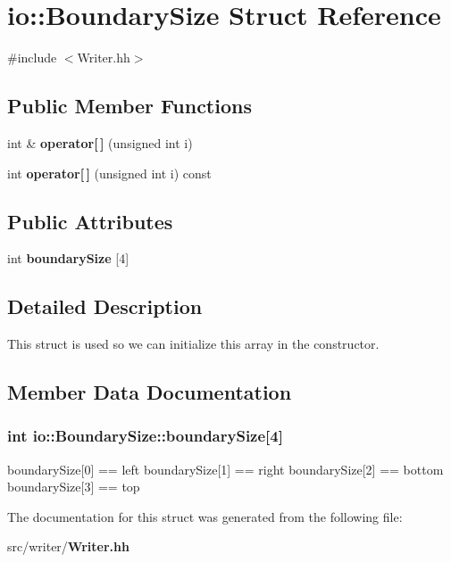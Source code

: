 \section{io\-:\-:Boundary\-Size Struct Reference}
\label{structio_1_1BoundarySize}


{\ttfamily \#include $<$Writer.\-hh$>$}

\subsection*{Public Member Functions}
\begin{DoxyCompactItemize}
\item 
int \& {\bfseries operator[$\,$]} (unsigned int i)\label{structio_1_1BoundarySize_a4130ec88292d4a0eff9c402a90ef907d}

\item 
int {\bfseries operator[$\,$]} (unsigned int i) const \label{structio_1_1BoundarySize_ab7593d2a82890d5d255c30d1dd8fee08}

\end{DoxyCompactItemize}
\subsection*{Public Attributes}
\begin{DoxyCompactItemize}
\item 
int {\bf boundary\-Size} [4]
\end{DoxyCompactItemize}


\subsection{Detailed Description}
This struct is used so we can initialize this array in the constructor. 

\subsection{Member Data Documentation}
\subsubsection[{boundary\-Size}]{\setlength{\rightskip}{0pt plus 5cm}int io\-::\-Boundary\-Size\-::boundary\-Size[4]}\label{structio_1_1BoundarySize_ae1ac1aecc0b840076b68948dc2ceba8a}
boundary\-Size[0] == left boundary\-Size[1] == right boundary\-Size[2] == bottom boundary\-Size[3] == top 

The documentation for this struct was generated from the following file\-:\begin{DoxyCompactItemize}
\item 
src/writer/{\bf Writer.\-hh}\end{DoxyCompactItemize}
